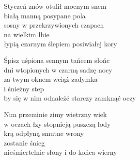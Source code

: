 \begin{text}
    Styczeń znów otulił mocnym snem\\
    białą manną posypane pola\\
    sosny w przekrzywionych czapach\\
    na wielkim łbie\\
    łypią czarnym ślepiem posiwiałej kory

    Śpisz uśpiona sennym tańcem słońc\\
    dni wtopionych w czarną sadzę nocy\\
    za twym oknem wciąż zadymka\\
    i śnieżny step\\
    by się w nim odnaleźć starczy zamknąć oczy

    Nim przeminie zimy wietrzny wiek\\
    w oczach łzy stopnieją puszczą lody\\
    krą odpłyną smutne wrony\\
    zostanie śnieg\\
    nieśmiertelnie słony i do końca wierny
\end{text}
\begin{chord}

\end{chord}